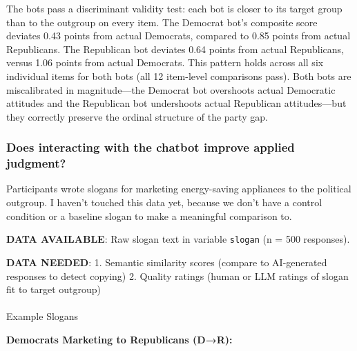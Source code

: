 \documentclass[
  11pt,
  oneside]{article}
\makeatletter
\let\oldparagraph\paragraph
\renewcommand{\paragraph}{
    \@ifstar
      \xxxParagraphStar
      \xxxParagraphNoStar
  }
\newcommand{\xxxParagraphStar}[1]{\oldparagraph*{#1}\mbox{}}
\newcommand{\xxxParagraphNoStar}[1]{\oldparagraph{#1}\mbox{}}
\makeatother
\begin{document}
The bots pass a discriminant validity test: each bot is closer to its
target group than to the outgroup on every item. The Democrat bot's
composite score deviates 0.43 points from actual Democrats, compared to
0.85 points from actual Republicans. The Republican bot deviates 0.64
points from actual Republicans, versus 1.06 points from actual
Democrats. This pattern holds across all six individual items for both
bots (all 12 item-level comparisons pass). Both bots are miscalibrated
in magnitude---the Democrat bot overshoots actual Democratic attitudes
and the Republican bot undershoots actual Republican attitudes---but
they correctly preserve the ordinal structure of the party gap.

\subsubsection{Does interacting with the chatbot improve applied
judgment?}\label{does-interacting-with-the-chatbot-improve-applied-judgment}

Participants wrote slogans for marketing energy-saving appliances to the
political outgroup. I haven't touched this data yet, because we don't
have a control condition or a baseline slogan to make a meaningful
comparison to.

\textbf{DATA AVAILABLE}: Raw slogan text in variable \texttt{slogan} (n
= 500 responses).

\textbf{DATA NEEDED}: 1. Semantic similarity scores (compare to
AI-generated responses to detect copying) 2. Quality ratings (human or
LLM ratings of slogan fit to target outgroup)

\paragraph{Example Slogans}\label{example-slogans}

\textbf{Democrats Marketing to Republicans (D→R):}
\end{document}
